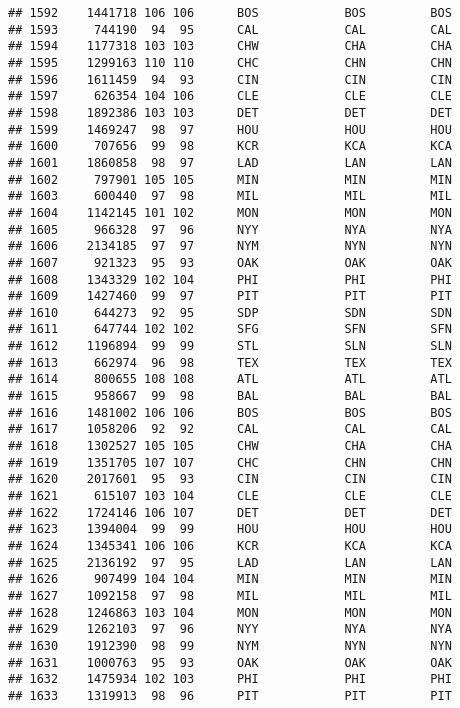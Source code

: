 \documentclass[]{article}
\begin{document}
\begin{verbatim}
## 1592    1441718 106 106      BOS            BOS         BOS
## 1593     744190  94  95      CAL            CAL         CAL
## 1594    1177318 103 103      CHW            CHA         CHA
## 1595    1299163 110 110      CHC            CHN         CHN
## 1596    1611459  94  93      CIN            CIN         CIN
## 1597     626354 104 106      CLE            CLE         CLE
## 1598    1892386 103 103      DET            DET         DET
## 1599    1469247  98  97      HOU            HOU         HOU
## 1600     707656  99  98      KCR            KCA         KCA
## 1601    1860858  98  97      LAD            LAN         LAN
## 1602     797901 105 105      MIN            MIN         MIN
## 1603     600440  97  98      MIL            MIL         MIL
## 1604    1142145 101 102      MON            MON         MON
## 1605     966328  97  96      NYY            NYA         NYA
## 1606    2134185  97  97      NYM            NYN         NYN
## 1607     921323  95  93      OAK            OAK         OAK
## 1608    1343329 102 104      PHI            PHI         PHI
## 1609    1427460  99  97      PIT            PIT         PIT
## 1610     644273  92  95      SDP            SDN         SDN
## 1611     647744 102 102      SFG            SFN         SFN
## 1612    1196894  99  99      STL            SLN         SLN
## 1613     662974  96  98      TEX            TEX         TEX
## 1614     800655 108 108      ATL            ATL         ATL
## 1615     958667  99  98      BAL            BAL         BAL
## 1616    1481002 106 106      BOS            BOS         BOS
## 1617    1058206  92  92      CAL            CAL         CAL
## 1618    1302527 105 105      CHW            CHA         CHA
## 1619    1351705 107 107      CHC            CHN         CHN
## 1620    2017601  95  93      CIN            CIN         CIN
## 1621     615107 103 104      CLE            CLE         CLE
## 1622    1724146 106 107      DET            DET         DET
## 1623    1394004  99  99      HOU            HOU         HOU
## 1624    1345341 106 106      KCR            KCA         KCA
## 1625    2136192  97  95      LAD            LAN         LAN
## 1626     907499 104 104      MIN            MIN         MIN
## 1627    1092158  97  98      MIL            MIL         MIL
## 1628    1246863 103 104      MON            MON         MON
## 1629    1262103  97  96      NYY            NYA         NYA
## 1630    1912390  98  99      NYM            NYN         NYN
## 1631    1000763  95  93      OAK            OAK         OAK
## 1632    1475934 102 103      PHI            PHI         PHI
## 1633    1319913  98  96      PIT            PIT         PIT

\end{verbatim}
\end{document}
